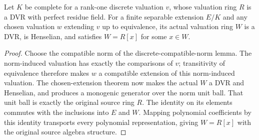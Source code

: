 \begin{lemma}
\label{fw:source-chosen-extension-generation}
\leanok
Let $K$ be complete for a rank-one discrete valuation $v$, whose
valuation ring $R$ is a DVR with perfect residue field. For a finite
separable extension $E/K$ and any chosen valuation $w$ extending $v$
up to equivalence, its actual valuation ring $W$ is a DVR, is Henselian,
and satisfies $W=R[x]$ for some $x\in W$.
\end{lemma}
\begin{proof}
Choose the compatible norm of the discrete-compatible-norm lemma.
The norm-induced valuation has exactly the comparisons of $v$;
transitivity of equivalence therefore makes $w$ a compatible extension
of this norm-induced valuation. The chosen-extension theorem now
makes the actual $W$ a DVR and Henselian, and produces a monogenic
generator over the norm unit ball. That unit ball is exactly the
original source ring $R$. The identity on its elements commutes with
the inclusions into $E$ and $W$. Mapping polynomial coefficients by
this identity transports every polynomial representation, giving
$W=R[x]$ with the original source algebra structure.
\end{proof}

